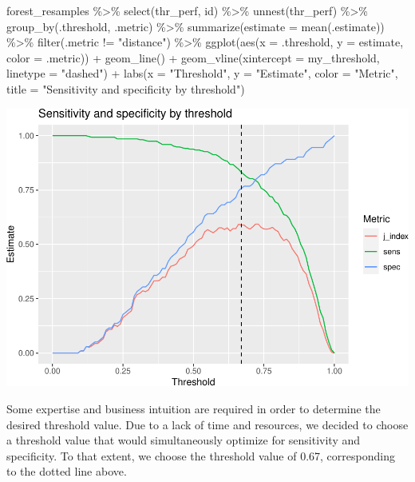 \documentclass[
]{article}
\newenvironment{Shaded}{\begin{snugshade}}{\end{snugshade}}
\newcommand{\AttributeTok}[1]{\textcolor[rgb]{0.77,0.63,0.00}{#1}}
\newcommand{\FunctionTok}[1]{\textcolor[rgb]{0.00,0.00,0.00}{#1}}
\newcommand{\NormalTok}[1]{#1}
\newcommand{\SpecialCharTok}[1]{\textcolor[rgb]{0.00,0.00,0.00}{#1}}
\newcommand{\StringTok}[1]{\textcolor[rgb]{0.31,0.60,0.02}{#1}}
\begin{document}
\begin{Shaded}
\begin{Highlighting}[]
\NormalTok{forest\_resamples }\SpecialCharTok{\%\textgreater{}\%}
  \FunctionTok{select}\NormalTok{(thr\_perf, id) }\SpecialCharTok{\%\textgreater{}\%}
  \FunctionTok{unnest}\NormalTok{(thr\_perf) }\SpecialCharTok{\%\textgreater{}\%}
  \FunctionTok{group\_by}\NormalTok{(.threshold, .metric) }\SpecialCharTok{\%\textgreater{}\%}
  \FunctionTok{summarize}\NormalTok{(}\AttributeTok{estimate =} \FunctionTok{mean}\NormalTok{(.estimate)) }\SpecialCharTok{\%\textgreater{}\%}
  \FunctionTok{filter}\NormalTok{(.metric }\SpecialCharTok{!=} \StringTok{"distance"}\NormalTok{) }\SpecialCharTok{\%\textgreater{}\%}
  \FunctionTok{ggplot}\NormalTok{(}\FunctionTok{aes}\NormalTok{(}\AttributeTok{x =}\NormalTok{ .threshold, }\AttributeTok{y =}\NormalTok{ estimate, }\AttributeTok{color =}\NormalTok{ .metric)) }\SpecialCharTok{+} \FunctionTok{geom\_line}\NormalTok{() }\SpecialCharTok{+}
  \FunctionTok{geom\_vline}\NormalTok{(}\AttributeTok{xintercept =}\NormalTok{ my\_threshold, }\AttributeTok{linetype =} \StringTok{"dashed"}\NormalTok{) }\SpecialCharTok{+}
  \FunctionTok{labs}\NormalTok{(}\AttributeTok{x =} \StringTok{"Threshold"}\NormalTok{, }\AttributeTok{y =} \StringTok{"Estimate"}\NormalTok{, }\AttributeTok{color =} \StringTok{"Metric"}\NormalTok{, }
      \AttributeTok{title =} \StringTok{"Sensitivity and specificity by threshold"}\NormalTok{)}
\end{Highlighting}
\end{Shaded}

\includegraphics{figures/report/fig-unnamed-chunk-24-1.pdf}

Some expertise and business intuition are required in order to determine
the desired threshold value. Due to a lack of time and resources, we
decided to choose a threshold value that would simultaneously optimize
for sensitivity and specificity. To that extent, we choose the threshold
value of 0.67, corresponding to the dotted line above.
\end{document}
